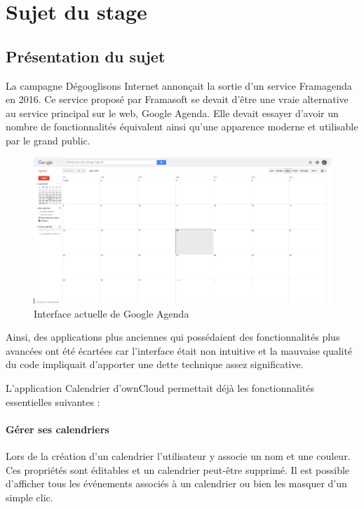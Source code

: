 \documentclass[10pt,a4paper, twoside]{report}
\begin{document}
	\newpage\null\thispagestyle{empty}\newpage
	\chapter{Sujet du stage}
	
	\section{Présentation du sujet}
	
	La campagne Dégooglisons Internet annonçait la sortie d'un service Framagenda en 2016. Ce service proposé par Framasoft se devait d'être une vraie alternative au service principal sur le web, Google Agenda. Elle devait essayer d'avoir un nombre de fonctionnalités équivalent ainsi qu'une apparence moderne et utilisable par le grand public.
	
	\begin{figure}[ht]
		\centering
		\centerline{\includegraphics[width=1.5\textwidth]{images/google-agenda-interface-actuelle.png}}
		\caption{Interface actuelle de Google Agenda}
		\label{normal_case}
	\end{figure}
	
	Ainsi, des applications plus anciennes qui possédaient des fonctionnalités plus avancées ont été écartées car l'interface était non intuitive et la mauvaise qualité du code impliquait d'apporter une dette technique assez significative.
	
	L'application Calendrier d'ownCloud permettait déjà les fonctionnalités essentielles suivantes :
	
	\subsubsection{Gérer ses calendriers}
	Lors de la création d'un calendrier l'utilisateur y associe un nom et une couleur. Ces propriétés sont éditables et un calendrier peut-être supprimé. Il est possible d'afficher tous les événements associés à un calendrier ou bien les masquer d'un simple clic.
	
\end{document}

